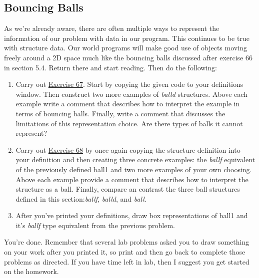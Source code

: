 \documentclass[nobib]{tufte-handout}
\begin{document}
\subsection*{Bouncing Balls}

As we're already aware, there are often multiple ways to represent the information  of our problem with data in our program. This continues to be true with structure data. Our world programs will make good use of objects moving freely around a 2D space much like the bouncing balls discussed after exercise 66 in section 5.4. Return there and start reading. Then do the following:

\begin{enumerate}[resume]
  \item Carry out \href{http://htdp.org/2018-01-06/Book/part_one.html#%28counter._%28exercise._struct4%29%29}{Exercise 67}. Start by copying the given code to your definitions window. Then construct two more examples of \textit{balld} structures.  Above each example write a comment that describes how to interpret the example in terms of bouncing balls. Finally, write a comment that discusses the limitations of this representation choice. Are there types of balls it cannot represent?

  \item Carry out \href{http://htdp.org/2018-01-06/Book/part_one.html#%28counter._%28exercise._struct5%29%29}{Exercise 68} by once again copying the structure definition into your definition and then creating three concrete examples: the \textit{ballf} equivalent of the previously defined ball1 and two more examples of your own choosing. Above each example provide a comment that describes how to interpret the structure as a ball. Finally, compare an contrast the three ball structures defined in this section:\textit{ballf}, \textit{balld}, and \textit{ball}.

  \item After you've printed your definitions, draw box representations of ball1 and it's \textit{ballf} type equivalent from the previous problem.
\end{enumerate}


You're done. Remember that several lab problems asked you to draw something on your work after you printed it, so print and then go back to complete those problems as directed. If you have time left in lab, then I suggest you get started on the homework.
\end{document}
